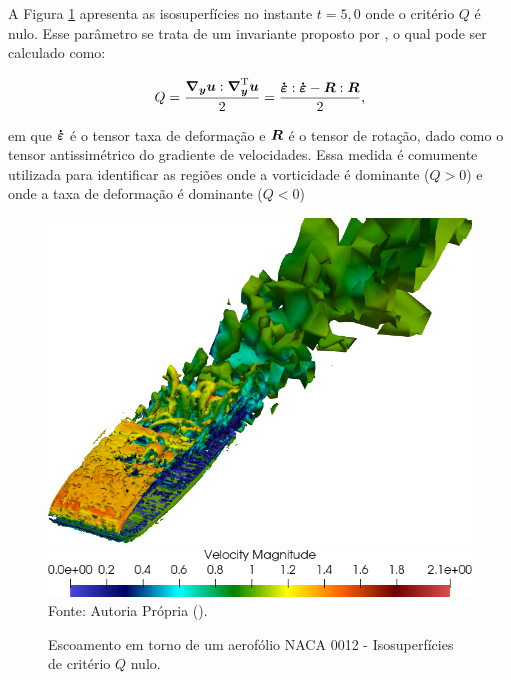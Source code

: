 A Figura \ref{fig:NACA0012-QCriterion} apresenta as isosuperfícies no instante $t=5,0$ onde o critério $Q$ é nulo. Esse parâmetro se trata de um invariante proposto por , o qual pode ser calculado como:

\begin{equation}
    Q=\frac{\boldsymbol{\nabla_y}\boldsymbol{u}:\boldsymbol{\nabla}^{\mathrm{T}}_{\boldsymbol{y}}\boldsymbol{u}}{2}=\frac{\boldsymbol{\dot{\boldsymbol{\varepsilon}}}:\boldsymbol{\dot{\boldsymbol{\varepsilon}}}-\boldsymbol{R}:\boldsymbol{R}}{2}\text{,}
\end{equation}

\noindent em que $\boldsymbol{\dot{\boldsymbol{\varepsilon}}}$ é o tensor taxa de deformação e $\boldsymbol{R}$ é o tensor de rotação, dado como o tensor antissimétrico do gradiente de velocidades. Essa medida é comumente utilizada para identificar as regiões onde a vorticidade é dominante ($Q>0$) e onde a taxa de deformação é dominante ($Q<0$) \cite{hunt1988eddies,piomelli2000large}

\begin{figure}[h!]
    \centering
    \caption{Escoamento em torno de um aerofólio NACA 0012 - Isosuperfícies de critério $Q$ nulo.}
    \includegraphics[width=.7\linewidth]{Figuras/NACA0012/QCriterion-500.png}
    \includegraphics[width=.5\linewidth]{Figuras/NACA0012/QCriterion-colormap-500.png}
    \\Fonte: Autoria Própria (\the\year).
    \label{fig:NACA0012-QCriterion}
\end{figure}


